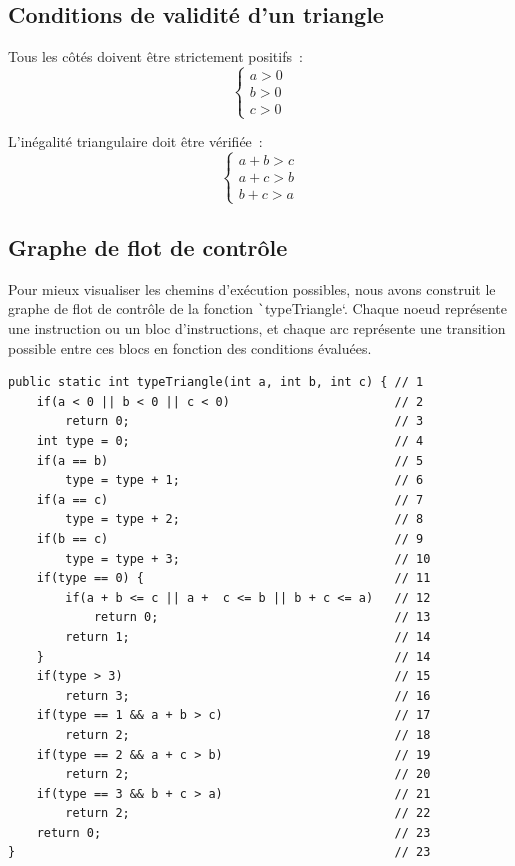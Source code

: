 \documentclass[a4paper,11pt]{article}
\begin{document}
\subsection{Conditions de validité d'un triangle}

Tous les côtés doivent être strictement positifs~:
$$\begin{cases} a > 0 \\ b > 0 \\ c > 0 \end{cases}$$

L'inégalité triangulaire doit être vérifiée~:
$$\begin{cases} a + b > c \\ a + c > b \\ b + c > a \end{cases}$$

\subsection{Graphe de flot de contrôle}

\label{flow}

Pour mieux visualiser les chemins d'exécution possibles, nous avons construit le graphe de flot de contrôle de la fonction \texttt`typeTriangle`. Chaque noeud représente une instruction ou un bloc d'instructions, et chaque arc représente une transition possible entre ces blocs en fonction des conditions évaluées.

\begin{verbatim}
public static int typeTriangle(int a, int b, int c) { // 1
    if(a < 0 || b < 0 || c < 0)                       // 2
        return 0;                                     // 3
    int type = 0;                                     // 4
    if(a == b)                                        // 5
        type = type + 1;                              // 6
    if(a == c)                                        // 7
        type = type + 2;                              // 8
    if(b == c)                                        // 9
        type = type + 3;                              // 10
    if(type == 0) {                                   // 11
        if(a + b <= c || a +  c <= b || b + c <= a)   // 12
            return 0;                                 // 13
        return 1;                                     // 14
    }                                                 // 14
    if(type > 3)                                      // 15
        return 3;                                     // 16
    if(type == 1 && a + b > c)                        // 17
        return 2;                                     // 18
    if(type == 2 && a + c > b)                        // 19
        return 2;                                     // 20
    if(type == 3 && b + c > a)                        // 21
        return 2;                                     // 22
    return 0;                                         // 23
}                                                     // 23
\end{verbatim}
\end{document}
